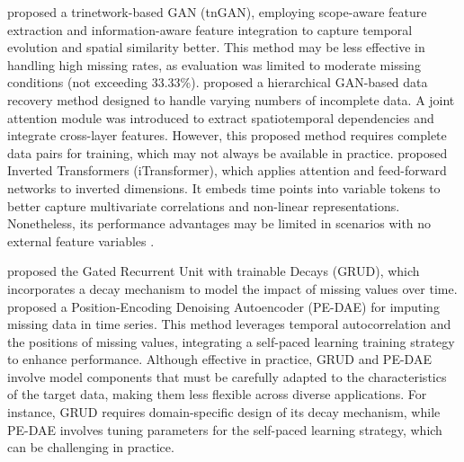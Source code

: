 \documentclass[3p,11pt,authoryear]{elsarticle}
\begin{document}
\citet{hu2020tngan} proposed a trinetwork-based GAN (tnGAN), employing scope-aware feature extraction and information-aware feature integration to capture temporal evolution and spatial similarity better. This method may be less effective in handling high missing rates, as evaluation was limited to moderate missing conditions (not exceeding 33.33\%).
\citet{hu2021hierarchical} proposed a hierarchical GAN-based data recovery method designed to handle varying numbers of incomplete data. A joint attention module was introduced to extract spatiotemporal dependencies and integrate cross-layer features. However, this proposed method requires complete data pairs for training, which may not always be available in practice.
\citet{liu2023itransformer} proposed Inverted Transformers (iTransformer), which applies attention and feed-forward networks to inverted dimensions. It embeds time points into variable tokens to better capture multivariate correlations and non-linear representations. Nonetheless, its performance advantages may be limited in scenarios with no external feature variables \citep{zhang2022handling, radivsic2023impact}.  

\citet{che2018grud} proposed the Gated Recurrent Unit with trainable Decays (GRUD), which incorporates a decay mechanism to model the impact of missing values over time. 
\citet{ou2024missing} proposed a Position-Encoding Denoising Autoencoder (PE-DAE) for imputing missing data in time series. This method leverages temporal autocorrelation and the positions of missing values, integrating a self-paced learning training strategy to enhance performance. 
Although effective in practice, GRUD and PE-DAE involve model components that must be carefully adapted to the characteristics of the target data, making them less flexible across diverse applications. For instance, GRUD requires domain-specific design of its decay mechanism, while PE-DAE involves tuning parameters for the self-paced learning strategy, which can be challenging in practice. 
\end{document}
